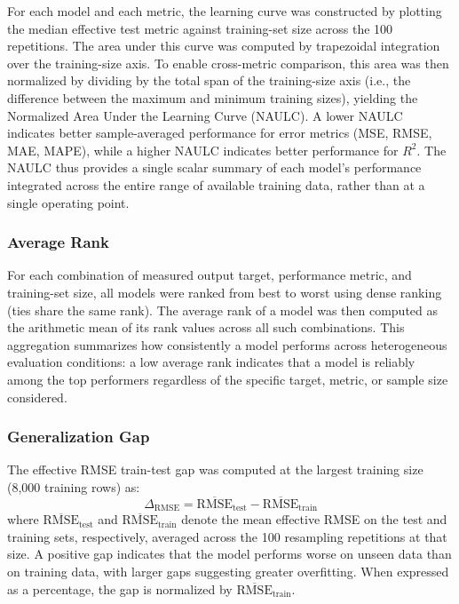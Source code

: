\documentclass[11pt]{article}
\begin{document}
For each model and each metric, the learning curve was constructed by plotting the median effective test metric against training-set size across the 100 repetitions. The area under this curve was computed by trapezoidal integration over the training-size axis. To enable cross-metric comparison, this area was then normalized by dividing by the total span of the training-size axis (i.e., the difference between the maximum and minimum training sizes), yielding the Normalized Area Under the Learning Curve (NAULC). A lower NAULC indicates better sample-averaged performance for error metrics (MSE, RMSE, MAE, MAPE), while a higher NAULC indicates better performance for $R^2$. The NAULC thus provides a single scalar summary of each model's performance integrated across the entire range of available training data, rather than at a single operating point.

\subsubsection{Average Rank}

For each combination of measured output target, performance metric, and training-set size, all models were ranked from best to worst using dense ranking (ties share the same rank). The average rank of a model was then computed as the arithmetic mean of its rank values across all such combinations. This aggregation summarizes how consistently a model performs across heterogeneous evaluation conditions: a low average rank indicates that a model is reliably among the top performers regardless of the specific target, metric, or sample size considered.

\subsubsection{Generalization Gap}

The effective RMSE train-test gap was computed at the largest training size (8,000 training rows) as:
\begin{equation*}
\Delta_{\mathrm{RMSE}} = \overline{\mathrm{RMSE}}_{\mathrm{test}} - \overline{\mathrm{RMSE}}_{\mathrm{train}}
\end{equation*}
where $\overline{\mathrm{RMSE}}_{\mathrm{test}}$ and $\overline{\mathrm{RMSE}}_{\mathrm{train}}$ denote the mean effective RMSE on the test and training sets, respectively, averaged across the 100 resampling repetitions at that size. A positive gap indicates that the model performs worse on unseen data than on training data, with larger gaps suggesting greater overfitting. When expressed as a percentage, the gap is normalized by $\overline{\mathrm{RMSE}}_{\mathrm{train}}$.
\end{document}

